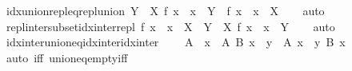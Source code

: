 \begin{isabellebody}
\ idx{\isacharunderscore}{\kern0pt}union{\isacharunderscore}{\kern0pt}repl{\isacharunderscore}{\kern0pt}eq{\isacharunderscore}{\kern0pt}repl{\isacharunderscore}{\kern0pt}union{\isacharcolon}{\kern0pt}\ {\isachardoublequoteopen}{\isacharparenleft}{\kern0pt}{\isasymUnion}Y\ {\isasymin}\ X{\isachardot}{\kern0pt}\ {\isacharbraceleft}{\kern0pt}f\ x\ {\isacharbar}{\kern0pt}\ x\ {\isasymin}\ Y{\isacharbraceright}{\kern0pt}{\isacharparenright}{\kern0pt}\ {\isacharequal}{\kern0pt}\ {\isacharbraceleft}{\kern0pt}f\ x\ {\isacharbar}{\kern0pt}\ x\ {\isasymin}\ {\isasymUnion}X{\isacharbraceright}{\kern0pt}{\isachardoublequoteclose}\isanewline
%
\isadelimproof
\ \ %
\endisadelimproof
%
\isatagproof
{}\isamarkupfalse%
\ auto%
\endisatagproof
{\isafoldproof}%
%
\isadelimproof
\isanewline
%
\endisadelimproof
\isanewline
{}\isamarkupfalse%
\ repl{\isacharunderscore}{\kern0pt}inter{\isacharunderscore}{\kern0pt}subset{\isacharunderscore}{\kern0pt}idx{\isacharunderscore}{\kern0pt}inter{\isacharunderscore}{\kern0pt}repl{\isacharcolon}{\kern0pt}\ {\isachardoublequoteopen}{\isacharbraceleft}{\kern0pt}f\ x\ {\isacharbar}{\kern0pt}\ x\ {\isasymin}\ {\isasymInter}X{\isacharbraceright}{\kern0pt}\ {\isasymsubseteq}\ {\isacharparenleft}{\kern0pt}{\isasymInter}Y\ {\isasymin}\ X{\isachardot}{\kern0pt}\ {\isacharbraceleft}{\kern0pt}f\ x\ {\isacharbar}{\kern0pt}\ x\ {\isasymin}\ Y{\isacharbraceright}{\kern0pt}{\isacharparenright}{\kern0pt}{\isachardoublequoteclose}\isanewline
%
\isadelimproof
\ \ %
\endisadelimproof
%
\isatagproof
{}\isamarkupfalse%
\ auto%
\endisatagproof
{\isafoldproof}%
%
\isadelimproof
\isanewline
%
\endisadelimproof
\isanewline
{}\isamarkupfalse%
\ idx{\isacharunderscore}{\kern0pt}inter{\isacharunderscore}{\kern0pt}union{\isacharunderscore}{\kern0pt}eq{\isacharunderscore}{\kern0pt}idx{\isacharunderscore}{\kern0pt}inter{\isacharunderscore}{\kern0pt}idx{\isacharunderscore}{\kern0pt}inter{\isacharcolon}{\kern0pt}\isanewline
\ \ {\isachardoublequoteopen}{\isacharbraceleft}{\kern0pt}{\isacharbraceright}{\kern0pt}\ {\isasymnotin}\ A\ {\isasymLongrightarrow}\ {\isacharparenleft}{\kern0pt}{\isasymInter}x\ {\isasymin}\ {\isasymUnion}A{\isachardot}{\kern0pt}\ B\ x{\isacharparenright}{\kern0pt}\ {\isacharequal}{\kern0pt}\ {\isacharparenleft}{\kern0pt}{\isasymInter}y\ {\isasymin}\ A{\isachardot}{\kern0pt}\ {\isasymInter}x\ {\isasymin}\ y{\isachardot}{\kern0pt}\ B\ x{\isacharparenright}{\kern0pt}{\isachardoublequoteclose}\isanewline
%
\isadelimproof
\ \ %
\endisadelimproof
%
\isatagproof
{}\isamarkupfalse%
\ {\isacharparenleft}{\kern0pt}auto\ iff{\isacharcolon}{\kern0pt}\ union{\isacharunderscore}{\kern0pt}eq{\isacharunderscore}{\kern0pt}empty{\isacharunderscore}{\kern0pt}iff{\isacharparenright}{\kern0pt}%

\end{isabellebody}
